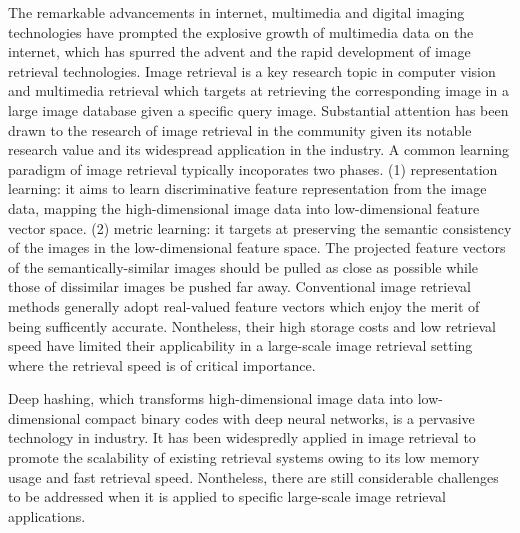 \begin{abstract*}
The remarkable advancements in internet, multimedia  and digital imaging technologies have prompted the explosive growth of multimedia data on the internet, which has spurred the advent and the rapid development of image retrieval technologies. Image retrieval is a key research topic in computer vision and multimedia retrieval which targets at retrieving the corresponding image in a large image database given a specific query image. Substantial attention has been drawn to the research of image retrieval in the community given its notable research value and its widespread application in the industry. A common learning paradigm of image retrieval typically incoporates two phases. (1) representation learning: it aims to learn discriminative feature representation from the image data, mapping the high-dimensional image data into low-dimensional feature vector space.  (2) metric learning: it targets at preserving the semantic consistency of the images in the low-dimensional feature space. The projected feature vectors of the semantically-similar images should be pulled as close as possible while those of  dissimilar images be pushed far away. Conventional image retrieval methods generally adopt real-valued feature vectors which enjoy the merit of being sufficently accurate. Nontheless, their high storage costs and low retrieval speed have limited their applicability in a large-scale image retrieval setting where the retrieval speed is of critical importance. \par
Deep hashing, which transforms high-dimensional image data into low-dimensional compact binary codes with deep neural networks, is a pervasive technology in industry.  It has been widespredly applied in image retrieval to promote the scalability of existing retrieval systems owing to its low memory usage and fast retrieval speed. Nontheless, there are still considerable challenges to be addressed when it is applied to specific large-scale image retrieval applications.
\begin{enumerate}

\end{enumerate}
\end{abstract*}
